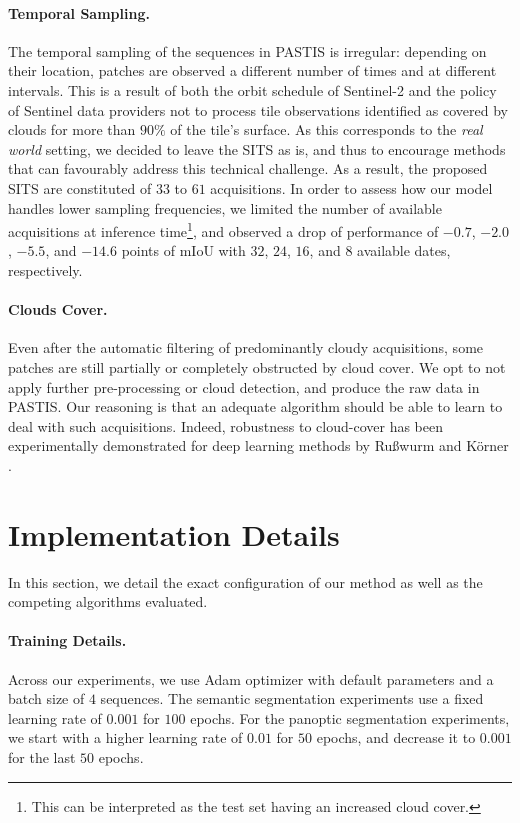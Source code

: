 \paragraph{Temporal Sampling.} The temporal sampling of the sequences in PASTIS is irregular: depending on their location, patches are observed a different number of times and at different intervals.
This is a result of both the orbit schedule of Sentinel-2 and the policy of Sentinel data providers not to process tile observations identified as covered by clouds for more than $90\%$ of the tile's surface.
As this corresponds to the \emph{real world} setting, we decided to leave the SITS as is, and thus to encourage methods that can favourably address this technical challenge. As a result, the proposed SITS are constituted of $33$ to $61$ acquisitions.
In order to assess how our model handles lower sampling frequencies, we limited the number of available acquisitions at inference time\footnote{This can be interpreted as the test set having an increased cloud cover.}, and observed a  drop of performance of $-0.7$, $-2.0$, $-5.5$, and $-14.6$ points of mIoU with $32$, $24$, $16$, and $8$ available dates, respectively.

\paragraph{Clouds Cover. } Even after the automatic filtering of predominantly cloudy acquisitions, some patches are still partially or completely obstructed by cloud cover. We opt to not apply further pre-processing or cloud detection, and produce the raw data in PASTIS. Our reasoning is that an adequate algorithm should be able to learn to deal with such acquisitions. Indeed, robustness to cloud-cover has been experimentally demonstrated for deep learning methods by Ru{\ss}wurm and K\"orner \cite{russwurm2018convolutional, russwurm2020self}.
\section{Implementation Details}
In this section, we detail the exact configuration of our method as well as the competing algorithms evaluated.

\paragraph{Training Details.} 
Across our experiments, we use Adam \cite{kingma2014adam} optimizer with default parameters and a batch size of $4$ sequences. The semantic segmentation experiments use a fixed learning rate of $0.001$ for $100$ epochs. For the panoptic segmentation experiments, we start with a higher learning rate of $0.01$ for $50$ epochs, and decrease it to $0.001$ for the last $50$ epochs.

